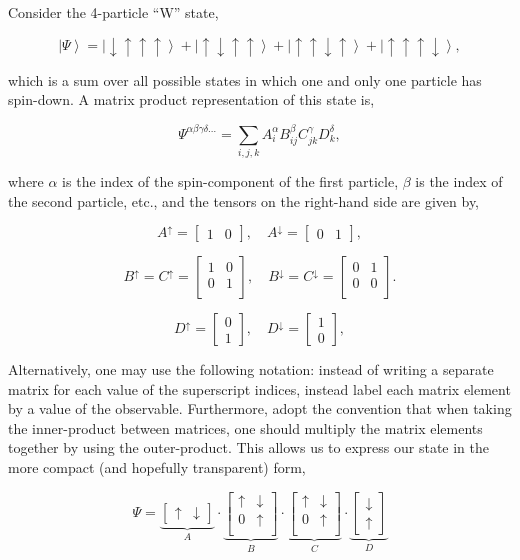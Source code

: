 \documentclass[12pt]{amsbook}
\theoremstyle{plain}
\theoremstyle{definition}
\theoremstyle{remark}
\newcommand{\bmat}[4]{
\begin{bmatrix}
#1 & #2\\
#3 & #4\\
\end{bmatrix}
}
\newcommand{\eqn}[2][]{\begin{equation}\label{#1}#2\end{equation}}
\newcommand{\ket}[1]{\left|#1\right>}
\begin{document}
Consider the 4-particle ``W'' state,

$$\ket{\Psi} = \ket{\downarrow\uparrow\uparrow\uparrow} + \ket{\uparrow\downarrow\uparrow\uparrow} + \ket{\uparrow\uparrow\downarrow\uparrow} + \ket{\uparrow\uparrow\uparrow\downarrow},$$

\noindent which is a sum over all possible states in which one and only one particle has spin-down.  A matrix product representation of this state is,

$$\Psi^{\alpha\beta\gamma\delta\dots} = \sum_{i,j,k} A_i^\alpha B_{ij}^\beta C_{jk}^\gamma D_{k}^\delta,$$

\noindent where $\alpha$ is the index of the spin-component of the first particle, $\beta$ is the index of the second particle, etc., and the tensors on the right-hand side are given by,

$$A^\uparrow = \begin{bmatrix} 1 & 0 \end{bmatrix}, \quad A^\downarrow = \begin{bmatrix} 0 & 1 \end{bmatrix},$$

$$B^\uparrow=C^\uparrow = \bmat{1}{0}{0}{1}, \quad B^\downarrow=C^\downarrow = \bmat{0}{1}{0}{0}.$$

$$D^\uparrow = \begin{bmatrix} 0 \\ 1 \end{bmatrix}, \quad D^\downarrow = \begin{bmatrix} 1 \\ 0 \end{bmatrix},$$

Alternatively, one may use the following notation:  instead of writing a separate matrix for each value of the superscript indices, instead label each matrix element by a value of the observable.  Furthermore, adopt the convention that when taking the inner-product between matrices, one should multiply the matrix elements together by using the outer-product.  This allows us to express our state in the more compact (and hopefully transparent) form,

\eqn[W-matrix-factorization]{\Psi = \underbrace{\begin{bmatrix}\uparrow & \downarrow \end{bmatrix}}_{A}\cdot
         \underbrace{\bmat{\uparrow}{\downarrow}{0}{\uparrow}}_{B}\cdot
         \underbrace{\bmat{\uparrow}{\downarrow}{0}{\uparrow}}_{C}\cdot
         \underbrace{\begin{bmatrix}\downarrow \\ \uparrow \end{bmatrix}}_{D}}
\end{document}
